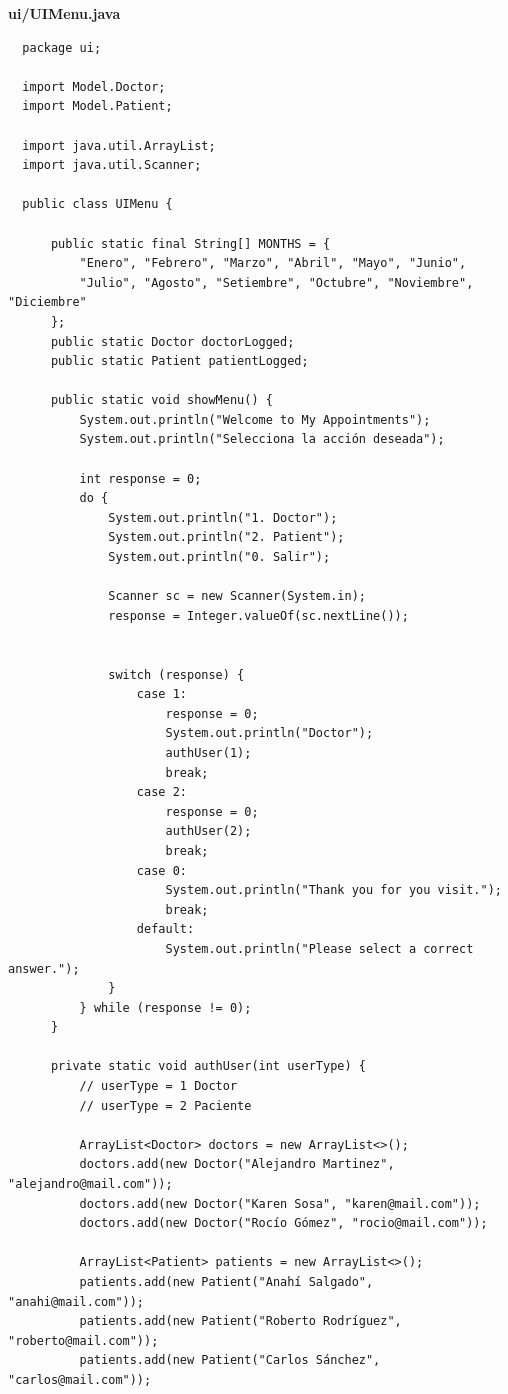 \documentclass{article}
\begin{document}
\textbf{ui/UIMenu.java}
\begin{verbatim}
  package ui;

  import Model.Doctor;
  import Model.Patient;

  import java.util.ArrayList;
  import java.util.Scanner;

  public class UIMenu {

      public static final String[] MONTHS = {
          "Enero", "Febrero", "Marzo", "Abril", "Mayo", "Junio",
          "Julio", "Agosto", "Setiembre", "Octubre", "Noviembre", "Diciembre"
      };
      public static Doctor doctorLogged;
      public static Patient patientLogged;

      public static void showMenu() {
          System.out.println("Welcome to My Appointments");
          System.out.println("Selecciona la acción deseada");

          int response = 0;
          do {
              System.out.println("1. Doctor");
              System.out.println("2. Patient");
              System.out.println("0. Salir");

              Scanner sc = new Scanner(System.in);
              response = Integer.valueOf(sc.nextLine());


              switch (response) {
                  case 1:
                      response = 0;
                      System.out.println("Doctor");
                      authUser(1);
                      break;
                  case 2:
                      response = 0;
                      authUser(2);
                      break;
                  case 0:
                      System.out.println("Thank you for you visit.");
                      break;
                  default:
                      System.out.println("Please select a correct answer.");
              }
          } while (response != 0);
      }

      private static void authUser(int userType) {
          // userType = 1 Doctor
          // userType = 2 Paciente

          ArrayList<Doctor> doctors = new ArrayList<>();
          doctors.add(new Doctor("Alejandro Martinez", "alejandro@mail.com"));
          doctors.add(new Doctor("Karen Sosa", "karen@mail.com"));
          doctors.add(new Doctor("Rocío Gómez", "rocio@mail.com"));

          ArrayList<Patient> patients = new ArrayList<>();
          patients.add(new Patient("Anahí Salgado", "anahi@mail.com"));
          patients.add(new Patient("Roberto Rodríguez", "roberto@mail.com"));
          patients.add(new Patient("Carlos Sánchez", "carlos@mail.com"));


\end{verbatim}
\end{document}
